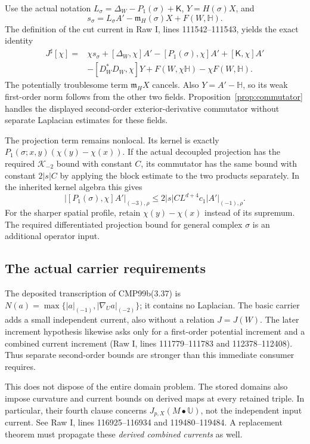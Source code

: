 \documentclass[11pt]{article}
\theoremstyle{remark}
\begin{document}
Use the actual notation
$L_\sigma=\Delta_W-P_1(\sigma)+\mathsf K$, $Y=H(\sigma)X$, and
\[
 s_\sigma=L_\sigma A'-\mathfrak m_H(\sigma)X+F(W,\mathbb H).
\]
The definition of the cut current in Raw I, lines 111542--111543, yields
the exact identity
\begin{align}\label{eq:cut-current}
 J^\sharp[\chi]={}&\chi s_\sigma
 +[\Delta_W,\chi]A'-[P_1(\sigma),\chi]A'
 +[\mathsf K,\chi]A'\nonumber\\
 &-[D_W^*D_W,\chi]Y
 +F(W,\chi\mathbb H)-\chi F(W,\mathbb H).
\end{align}
The potentially troublesome term $\mathfrak m_H X$ cancels. Also
$Y=A'-\mathbb H$, so its weak first-order norm follows from the other
two fields. Proposition~\ref{prop:commutator} handles the displayed
second-order exterior-derivative commutator without separate Laplacian
estimates for these fields.

The projection term remains nonlocal. Its kernel is exactly
$P_1(\sigma;x,y)(\chi(y)-\chi(x))$. If the actual decoupled projection
has the required $\mathcal K_{-2}$ bound with constant $C$, its
commutator has the same bound with constant $2|s|C$ by applying the
block estimate to the two products separately. In the inherited kernel
algebra this gives
\[
 |[P_1(\sigma),\chi]A'|_{(-3),\rho}
 \le2|s|CL^{d+4}c_1|A'|_{(-1),\rho}.
\]
For the sharper spatial profile, retain $\chi(y)-\chi(x)$ instead of
its supremum. The required differentiated projection bound for general
complex $\sigma$ is an additional operator input.

\subsection{The actual carrier requirements}

The deposited transcription of CMP99b(3.37) is
$N(a)=\max\{|a|_{(-1)},|\nabla_Ua|_{(-2)}\}$; it contains no
Laplacian. The basic carrier adds a small independent current, also
without a relation $J=J(W)$. The later increment hypothesis likewise
asks only for a first-order potential increment and a combined current
increment (Raw I, lines 111779--111783 and 112378--112408).
Thus separate second-order bounds are stronger than this immediate
consumer requires.

This does not dispose of the entire domain problem. The stored domains
also impose curvature and current bounds on derived maps at every
retained triple. In particular, their fourth clause concerns
$J_{p,X}(M\!\bullet\mathbb U)$, not the independent input current.
See Raw I, lines 116925--116934 and 119480--119484. A replacement theorem
must propagate these \emph{derived combined currents} as well.
\end{document}
